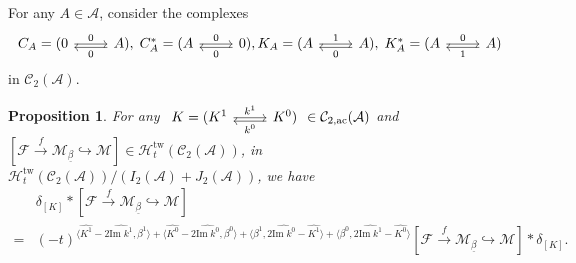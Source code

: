 \documentclass[12pt]{amsart}
\newtheorem{proposition}[theorem]{Proposition}
\theoremstyle{definition}
\numberwithin{equation}{section}
\begin{document}
For any $ A \in \mathcal{A} $, consider the complexes
\[\begin{tikzcd}
    C_A = (0 \arrow[r,"0"] & A),\;  C_A^* = (A \arrow[l, shift left, "0"] \arrow[r,"0"] & 0) \arrow[l, shift left, "0"],
    K_A = (A \arrow[r,"1"] & A),\;  K_A^* = (A \arrow[l, shift left, "0"] \arrow[r,"0"] & A \arrow[l, shift left, "1"])
\end{tikzcd} \]
in $ \mathcal{C}_2(\mathcal{A}) $.

\begin{proposition}
     \label{KX=XK}
     For any   $ \begin{tikzcd}
    K = (K^1 \arrow[r,"k^1"] & K^0) \arrow[l, shift left,"k^0"] \end{tikzcd} \in \mathcal{C}_{2,\mathrm{ac}}(\mathcal{A}) $ and $ [\mathcal{F} \xrightarrow{f} \mathcal{M}_{\underline{\beta}} \hookrightarrow \mathcal{M} ] \in \mathcal{H}_t^{\mathrm{tw}}(\mathcal{C}_2(\mathcal{A})) $, in $ \mathcal{H}_t^{\mathrm{tw}}(\mathcal{C}_2(\mathcal{A}))/(I_2(\mathcal{A})+J_2(\mathcal{A})) $, we have
     \begin{align*}
         &\delta_{[K]} * [\mathcal{F} \xrightarrow{f} \mathcal{M}_{\underline{\beta}} \hookrightarrow \mathcal{M} ] \\
         =& (-t)^{\langle \widehat{K^1} - 2 \widehat{\mathrm{Im}\;k^1},\beta^1 \rangle + \langle \widehat{K^0} - 2 \widehat{\mathrm{Im}\;k^0},\beta^0 \rangle + \langle \beta^1,2 \widehat{\mathrm{Im}\;k^0}-\widehat{K^1}  \rangle + \langle \beta^0, 2 \widehat{\mathrm{Im}\;k^1}-\widehat{K^0}\rangle}[\mathcal{F} \xrightarrow{f} \mathcal{M}_{\underline{\beta}} \hookrightarrow \mathcal{M} ] * \delta_{[K]}.
     \end{align*}
     
\end{proposition}
\end{document}
